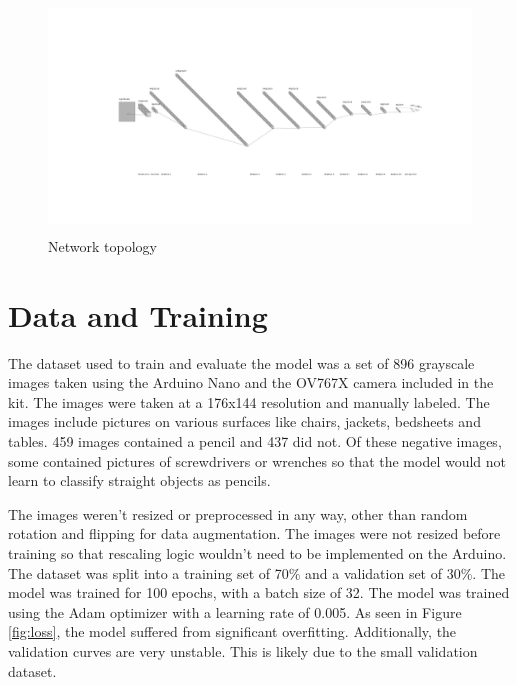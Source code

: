 \documentclass{article}
\begin{document}
\begin{figure}[ht]
    \begin{center}
    \includegraphics[width=350pt,height=175pt]{images/nn.png}
    \caption{Network topology}
    \label{fig:network}
    \end{center}
\end{figure}

\section{Data and Training}
The dataset used to train and evaluate the model was a set
of 896 grayscale images taken using the Arduino Nano and the
OV767X camera included in the kit. The images were taken at
a 176x144 resolution and manually labeled. The images
include pictures on various surfaces like chairs, jackets,
bedsheets and tables. 459 images contained a pencil and 437
did not. Of these negative images, some contained pictures
of screwdrivers or wrenches so that the model would not
learn to classify straight objects as pencils.

The images weren't resized or preprocessed in any way, other
than random rotation and flipping for data augmentation. The
images were not resized before training so that rescaling
logic wouldn't need to be implemented on the Arduino. The
dataset was split into a training set of 70\% and a
validation set of 30\%. The model was trained for 100
epochs, with a batch size of 32. The model was trained using
the Adam optimizer with a learning rate of 0.005. As seen in
Figure \ref{fig:loss}, the model suffered from significant
overfitting. Additionally, the validation curves are very
unstable. This is likely due to the small validation
dataset.
\end{document}
